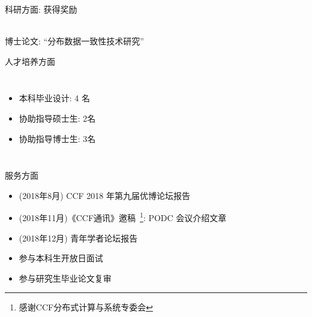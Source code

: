 \begin{frame}{科研方面: 获得奖励}
  
  \begin{center}
     \\[8pt]
    博士论文: ``分布数据一致性技术研究''
  \end{center}
\end{frame}

\begin{frame}{人才培养方面}
  \begin{center}
  \end{center}

  \begin{columns}
      \begin{itemize}
	\setlength{\itemsep}{8pt}
	\item 本科毕业设计: 4 名
	\item 协助指导硕士生: 2名
	\item 协助指导博士生: 3名
      \end{itemize}
      \vspace{-0.50cm}
  \end{columns}
\end{frame}

\begin{frame}{服务方面}
  \setcounter{footnote}{0} 
  \begin{itemize}
    \setlength{\itemsep}{10pt}
    \item (2018年8月) CCF 2018 年第九届优博论坛报告
    \item (2018年11月)《CCF通讯》邀稿~\footnote{感谢CCF分布式计算与系统专委会}: PODC 会议介绍文章
    \item (2018年12月) 青年学者论坛报告
    \item 参与本科生开放日面试
    \item 参与研究生毕业论文复审
  \end{itemize}
\end{frame}
